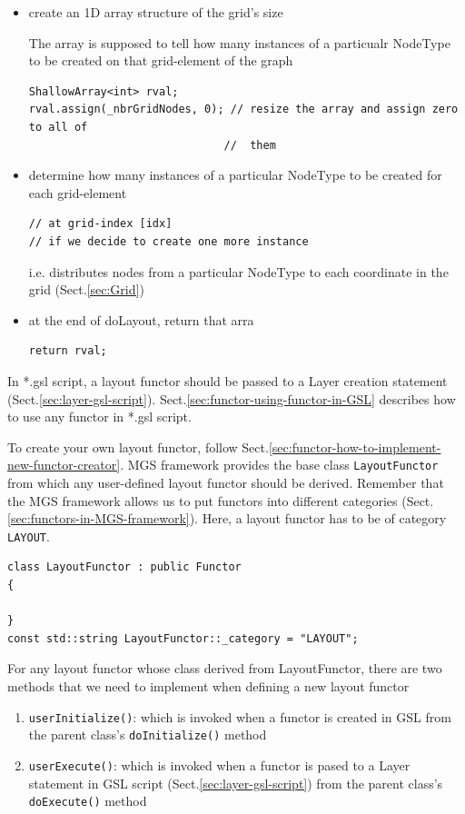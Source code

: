 \begin{itemize}
  \item create an 1D array structure of the grid's size

The array is supposed to tell how many instances of a particualr NodeType to be
created on that grid-element of the graph

\begin{verbatim}
ShallowArray<int> rval;
rval.assign(_nbrGridNodes, 0); // resize the array and assign zero to all of
                              //  them
\end{verbatim}
    
  \item determine how many instances of a particular NodeType to be created for
  each grid-element
  
\begin{verbatim}
// at grid-index [idx]
// if we decide to create one more instance

\end{verbatim}
i.e. distributes nodes from a particular NodeType to each coordinate
in the grid (Sect.\ref{sec:Grid})

   \item at the end of doLayout, return that arra
\begin{verbatim}
return rval;
\end{verbatim}
\end{itemize}

In *.gsl script, a layout functor should be passed to a Layer creation statement
(Sect.\ref{sec:layer-gsl-script}).
Sect.\ref{sec:functor-using-functor-in-GSL} describes how to use any functor in
*.gsl script.

\begin{mdframed}

To create your own layout functor, follow
Sect.\ref{sec:functor-how-to-implement-new-functor-creator}. 
MGS framework provides the base class \verb!LayoutFunctor! from which any
user-defined layout functor should be derived. Remember that the MGS framework
allows us to put functors into different categories
(Sect.\ref{sec:functors-in-MGS-framework}). Here, a layout functor has to be of
category \verb!LAYOUT!. 
\begin{verbatim}
class LayoutFunctor : public Functor
{

}
const std::string LayoutFunctor::_category = "LAYOUT";
\end{verbatim}

For any layout functor whose class derived from LayoutFunctor, there are two
methods that we need to implement when defining a new layout functor
\begin{enumerate}
  \item \verb!userInitialize()!: which is invoked when a functor is created in
  GSL from the parent class's \verb!doInitialize()! method
  
  \item \verb!userExecute()!: which is invoked when a functor is pased to a
  Layer statement in GSL script (Sect.\ref{sec:layer-gsl-script}) from the
  parent class's \verb!doExecute()! method
\end{enumerate}
\end{mdframed}


